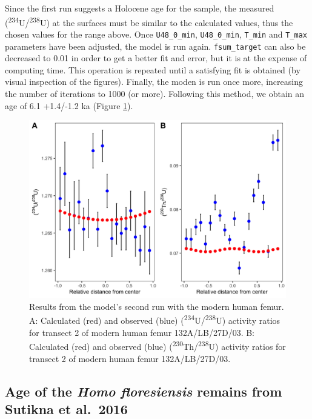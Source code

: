 \documentclass[]{elsarticle} %
\begin{document}
\FloatBarrier

Since the first run suggests a Holocene age for the sample, the measured (\textsuperscript{234}U/\textsuperscript{238}U) at the surfaces must be similar to the calculated values, thus the chosen values for the range above. Once \texttt{U48\_0\_min}, \texttt{U48\_0\_min}, \texttt{T\_min} and \texttt{T\_max} parameters have been adjusted, the model is run again. \texttt{fsum\_target} can also be decreased to 0.01 in order to get a better fit and error, but it is at the expense of computing time. This operation is repeated until a satisfying fit is obtained (by visual inspection of the figures). Finally, the moden is run once more, increasing the number of iterations to 1000 (or more). Following this method, we obtain an age of 6.1 +1.4/-1.2 ka (Figure \ref{fig:plot-panel-second-run-modern-fig}).



\begin{figure}
\includegraphics[width=1\linewidth]{figures/plot-panel-second-run-modern} \caption{Results from the model's second run with the modern human femur. A: Calculated (red) and observed (blue) (\textsuperscript{234}U/\textsuperscript{238}U) activity ratios for transect 2 of modern human femur 132A/LB/27D/03. B: Calculated (red) and observed (blue) (\textsuperscript{230}Th/\textsuperscript{238}U) activity ratios for transect 2 of modern human femur 132A/LB/27D/03.}\label{fig:plot-panel-second-run-modern-fig}
\end{figure}

\FloatBarrier

\hypertarget{age-of-the-homo-floresiensis-remains-from-sutikna-et-al.2016}{%
\subsection{\texorpdfstring{Age of the \emph{Homo floresiensis} remains from Sutikna et al.~2016}{Age of the Homo floresiensis remains from Sutikna et al.~2016}}\label{age-of-the-homo-floresiensis-remains-from-sutikna-et-al.2016}}
\end{document}
